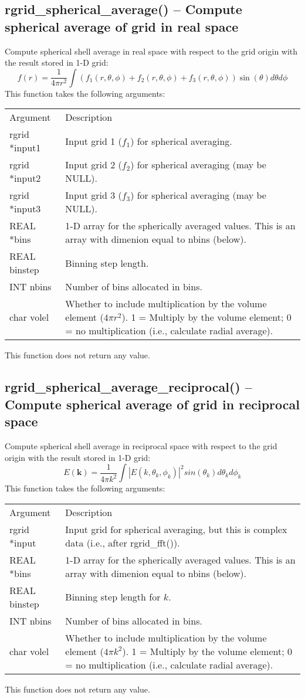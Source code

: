 \documentclass[12pt,letterpaper]{report}
\begin{document}
\subsection{rgrid\_spherical\_average() -- Compute spherical average of grid in real space}

Compute spherical shell average in real space with respect to the grid origin with the result stored in 1-D grid:
$$f(r) = \frac{1}{4\pi r^2}\int \left(f_1(r, \theta, \phi) + f_2(r, \theta, \phi) + f_3(r, \theta, \phi)\right) \sin(\theta) d\theta d\phi$$
This function takes the following arguments:
\begin{longtable}{p{} p{}}
Argument & Description\\
\cline{1-2}
rgrid *input1 & Input grid 1 ($f_1$) for spherical averaging.\\
rgrid *input2 & Input grid 2 ($f_2$) for spherical averaging (may be NULL).\\
rgrid *input3 & Input grid 3 ($f_3$) for spherical averaging (may be NULL).\\
REAL *bins & 1-D array for the spherically averaged values. This is an array with dimenion equal to nbins (below).\\
REAL binstep & Binning step length.\\
INT nbins & Number of bins allocated in bins.\\
char volel & Whether to include multiplication by the volume element ($4\pi r^2$). 1 = Multiply by the volume element; 0 = no multiplication (i.e., calculate radial average).\\
\end{longtable}
\noindent
This function does not return any value.

\subsection{rgrid\_spherical\_average\_reciprocal() -- Compute spherical average of grid in reciprocal space}

Compute spherical shell average in reciprocal space with respect to the grid origin with the result stored in 1-D grid:
$$E(\mathbf{k}) = \frac{1}{4\pi k^2} \int |E(k, \theta_k, \phi_k)|^2 sin(\theta_k) d\theta_k d\phi_k$$
This function takes the following arguments:
\begin{longtable}{p{} p{}}
Argument & Description\\
\cline{1-2}
rgrid *input & Input grid for spherical averaging, but this is complex data (i.e., after rgrid\_fft()).\\
REAL *bins & 1-D array for the spherically averaged values. This is an array with dimenion equal to nbins (below).\\
REAL binstep & Binning step length for $k$.\\
INT nbins & Number of bins allocated in bins.\\
char volel & Whether to include multiplication by the volume element ($4\pi k^2$). 1 = Multiply by the volume element; 0 = no multiplication (i.e., calculate radial average).\\
\end{longtable}
\noindent
This function does not return any value. 
\end{document}
